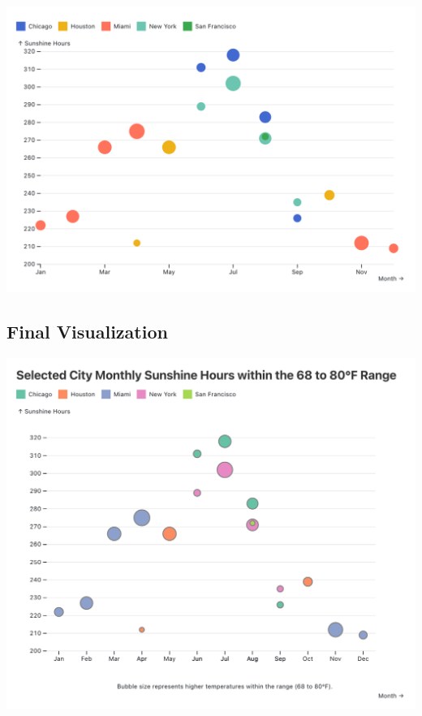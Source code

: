 \documentclass{article}
\begin{document}
\begin{center}
    \includegraphics[scale=0.2]{bubble.png}
\end{center}

\pagebreak

\subsection{Final Visualization}

\begin{center}
    \includegraphics[width=\textwidth]{final.png}
\end{center}
\end{document}
